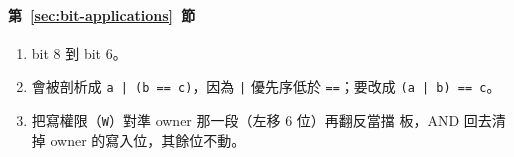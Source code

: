 \paragraph{第~\ref{sec:bit-applications}~節}
\begin{enumerate}
\item bit 8 到 bit 6。
\item 會被剖析成 \texttt{a | (b == c)}，因為 \texttt{|} 優先序低於
\texttt{==}；要改成 \texttt{(a | b) == c}。
\item 把寫權限（\texttt{W}）對準 owner 那一段（左移 6 位）再翻反當擋
板，AND 回去清掉 owner 的寫入位，其餘位不動。
\end{enumerate}
